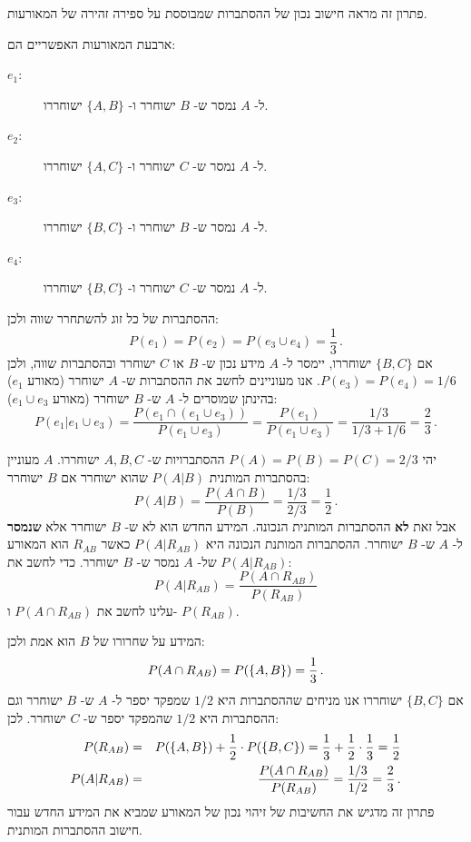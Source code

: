 
פתרון זה מראה חישוב נכון של ההסתברות שמבוססת על ספירה זהירה של המאורעות.

ארבעת המאורעות האפשריים הם:
\begin{description}
\item[$e_1$:] 
ל-%
$A$
נמסר ש-%
$B$
ישוחרר ו-%
$\{A,B\}$
ישוחררו.
\item[$e_2$:]
ל-%
$A$
נמסר ש-%
$C$
ישוחרר ו-%
$\{A,C\}$
ישוחררו.
\item[$e_3$:]
ל-%
$A$
נמסר ש-%
$B$
ישוחרר ו-%
$\{B,C\}$
ישוחררו.
\item[$e_4$:]
ל-%
$A$
נמסר ש-%
$C$
ישוחרר ו-%
$\{B,C\}$
ישוחררו.
\end{description}
ההסתברות של כל זוג להשתחרר שווה ולכן:
\[
P(e_1)=P(e_2)=P(e_3\cup e_4)=\frac{1}{3}\,.
\]
אם 
$\{B,C\}$
ישוחררו, יימסר ל-%
$A$
מידע נכון ש-%
$B$
או 
$C$
ישוחרר ובהסתברות שווה, ולכן
$P(e_3)=P(e_4)=1/6$.
אנו מעוניינים לחשב את ההסתברות ש-%
$A$
ישוחרר (מאורע
$e_1$)
בהינתן שמוסרים ל-%
$A$
ש-%
$B$
ישוחרר (מאורע
$e_1\cup e_3$):
\[
P(e_1|e_1\cup e_3) = \frac{P(e_1\cap(e_1\cup e_3))}{P(e_1\cup e_3)}=\frac{P(e_1)}{P(e_1\cup e_3)}=\frac{1/3}{1/3+1/6}=\frac{2}{3}\,.
\]



יהי 
$P(A)= P(B)=P(C)=2/3$
ההסתברויות ש-%
$A,B,C$
ישוחררו.
$A$
מעוניין בהסתברות המותנית 
$P(A|B)$
שהוא ישוחרר אם 
$B$
ישוחרר:
\[
P(A|B) = \frac{P(A\cap B)}{P(B)} = \frac{1/3}{2/3}=\frac{1}{2}\,.
\]
אבל זאת 
\textbf{לא}
ההסתברות המותנית הנכונה. המידע החדש הוא לא ש-%
$B$
ישוחרר אלא
\textbf{שנמסר}
ל-%
$A$
ש-%
$B$
ישוחרר. ההסתברות המותנת הנכונה היא
$P(A|R_{AB})$
כאשר
$R_{AB}$
הוא המאורע של-%
$A$
נמסר ש-%
$B$
ישוחרר. כדי לחשב את
$P(A|R_{AB})$:
\[
P(A|R_{AB}) = \frac{P(A\cap R_{AB})}{P(R_{AB})}
\]
עלינו לחשב את
$P(A\cap R_{AB})$
ו-%
$P(R_{AB})$.

המידע על שחרורו של
$B$
הוא אמת ולכן:
\[
P(A\cap R_{AB})=P(\{A,B\})=\displaystyle\frac{1}{3}\,.
\]
אם 
$\{B,C\}$
ישוחררו אנו מניחים שההסתברות היא
$1/2$
שמפקד יספר ל-%
$A$
ש-%
$B$
ישוחרר וגם ההסתברות היא
$1/2$
שהמפקד יספר ש-%
$C$
ישוחרר. לכן:
\begin{eqnarray*}
P(R_{AB})&=&P(\{A,B\})+\displaystyle\frac{1}{2}\cdot P(\{B,C\})=\displaystyle\frac{1}{3}+\displaystyle\frac{1}{2}\cdot \displaystyle\frac{1}{3}=\displaystyle\frac{1}{2}\\
P(A|R_{AB}) &=& \frac{P(A\cap R_{AB})}{P(R_{AB})} = \displaystyle\frac{1/3}{1/2}=\displaystyle\frac{2}{3}\,.
\end{eqnarray*}
פתרון זה מדגיש את החשיבות של זיהוי נכון של המאורע שמביא את המידע החדש עבור חישוב ההסתברות המותנית.

